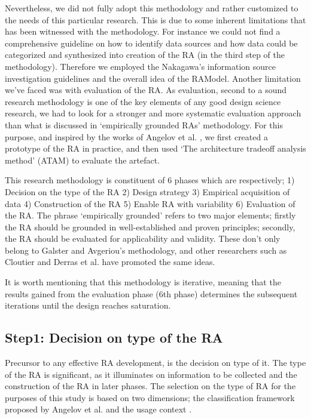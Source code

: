 \documentclass[review]{elsarticle}
\begin{document}
Nevertheless, we did not fully adopt this methodology and rather customized to the needs of this particular research. This is due to some inherent limitations that has been witnessed with the methodology. For instance we could not find a comprehensive guideline on how to identify data sources and how data could be categorized and synthesized into creation of the RA (in the third step of the methodology). Therefore we employed the Nakagawa's information source investigation guidelines and the overall idea of the RAModel. Another limitation we've faced was with evaluation of the RA. As evaluation, second to a sound research methodology is one of the key elements of any good design science research, we had to look for a stronger and more systematic evaluation approach than what is discussed in `empirically grounded RAs' methodology. For this purpose, and inspired by the works of Angelov et al. \cite{angelov2008towards,angelov2014extending}, we first created a prototype of the RA in practice, and then used `The architecture tradeoff analysis method' (ATAM) \cite{kazman1998architecture} to evaluate the artefact.

This research methodology is constituent of 6 phases which are respectively; 1) Decision on the type of the RA 2) Design strategy 3) Empirical acquisition of data 4) Construction of the RA 5) Enable RA with variability 6) Evaluation of the RA. The phrase `empirically grounded' refers to two major elements; firstly the RA should be grounded in well-established and proven principles; secondly, the RA should be evaluated for applicability and validity. These don't only belong to Galster and Avgeriou's methodology, and other researchers such as Cloutier \cite{Cloutier} and Derras et al. \cite{Derras} have promoted the same ideas.

It is worth mentioning that this methodology is iterative, meaning that the results gained from the evaluation phase (6th phase) determines the subsequent iterations until the design reaches saturation.

\subsection{Step1: Decision on type of the RA}

Precursor to any effective RA development, is the decision on type of it. The type of the RA is significant, as it illuminates on information to be collected and the construction of the RA in later phases. The selection on the type of RA for the purposes of this study is based on two dimensions; the classification framework proposed by Angelov et al. \cite{angelov2009classification} and the usage context \cite{angelov2008contracting}.
\end{document}

